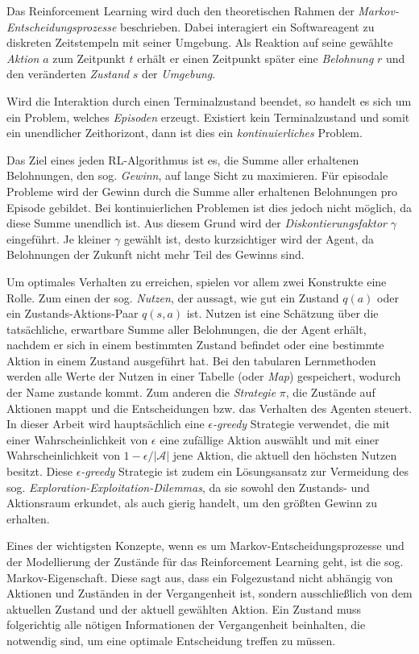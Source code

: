 Das Reinforcement Learning wird duch den theoretischen Rahmen der \textit{Markov-Entscheidungsprozesse} beschrieben. Dabei interagiert ein Softwareagent zu diskreten Zeitstempeln mit seiner Umgebung. Als Reaktion auf seine gewählte \textit{Aktion} $a$ zum Zeitpunkt $t$ erhält er einen Zeitpunkt später eine \textit{Belohnung} $r$ und den veränderten \textit{Zustand} $s$ der \textit{Umgebung}.
\par 
Wird die Interaktion durch einen Terminalzustand beendet, so handelt es sich um ein Problem, welches \textit{Episoden} erzeugt. Existiert kein Terminalzustand und somit ein unendlicher Zeithorizont, dann ist dies ein \textit{kontinuierliches} Problem.
\par 
Das Ziel eines jeden RL-Algorithmus ist es, die Summe aller erhaltenen Belohnungen, den sog. \textit{Gewinn}, auf lange Sicht zu maximieren. Für episodale Probleme wird der Gewinn durch die Summe aller erhaltenen Belohnungen pro Episode gebildet. Bei kontinuierlichen Problemen ist dies jedoch nicht möglich, da diese Summe unendlich ist. Aus diesem Grund wird der \textit{Diskontierungsfaktor} $\gamma$ eingeführt. Je kleiner $\gamma$ gewählt ist, desto \glqq kurzsichtiger\grqq{} wird der Agent, da Belohnungen der Zukunft nicht mehr Teil des Gewinns sind.
\par 
Um optimales Verhalten zu erreichen, spielen vor allem zwei Konstrukte eine Rolle. Zum einen der sog. \textit{Nutzen}, der aussagt, wie \glqq gut\grqq{} ein Zustand $q(a)$ oder ein Zustands-Aktions-Paar $q(s,a)$ ist. \glqq Nutzen\grqq{} ist eine Schätzung über die tatsächliche, erwartbare Summe aller Belohnungen, die der Agent erhält, nachdem er sich in einem bestimmten Zustand befindet oder eine bestimmte Aktion in einem Zustand ausgeführt hat. Bei den tabularen Lernmethoden werden alle Werte der Nutzen in einer \glqq Tabelle\grqq{} (oder \textit{Map}) gespeichert, wodurch der Name zustande kommt.  
Zum anderen die \textit{Strategie} $\pi$, die Zustände auf Aktionen mappt und die Entscheidungen bzw. das Verhalten des Agenten steuert. In dieser Arbeit wird hauptsächlich eine $\epsilon$\textit{-greedy} Strategie verwendet, die mit einer Wahrscheinlichkeit von $\epsilon$ eine zufällige Aktion auswählt und mit einer Wahrscheinlichkeit von $1-\epsilon / |\mathcal{A}|$ jene Aktion, die aktuell den höchsten Nutzen besitzt. Diese $\epsilon$\textit{-greedy} Strategie ist zudem ein Lösungsansatz zur Vermeidung des sog. \textit{Exploration-Exploitation-Dilemmas}, da sie sowohl den Zustands- und Aktionsraum erkundet, als auch gierig handelt, um den größten Gewinn zu erhalten.
\par 
Eines der wichtigsten Konzepte, wenn es um Markov-Entscheidungsprozesse und der Modellierung der Zustände für das Reinforcement Learning geht, ist die sog. Markov-Eigenschaft. Diese sagt aus, dass ein Folgezustand nicht abhängig von Aktionen und Zuständen in der Vergangenheit ist, sondern ausschließlich von dem aktuellen Zustand und der aktuell gewählten Aktion. Ein Zustand muss folgerichtig alle nötigen Informationen der Vergangenheit beinhalten, die notwendig sind, um eine optimale Entscheidung treffen zu müssen.
